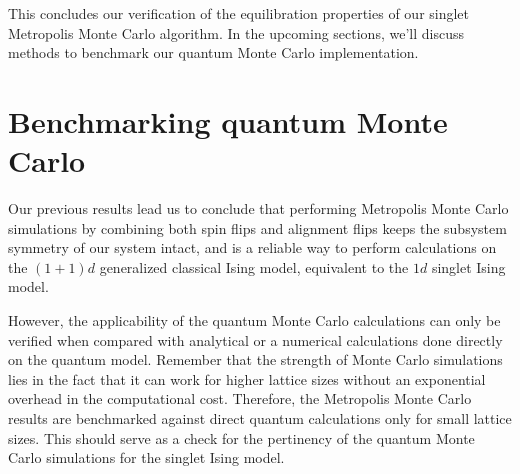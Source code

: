 \documentclass[../thesis_main.tex]{subfiles}
\begin{document}
This concludes our verification of the equilibration properties of our singlet Metropolis Monte Carlo algorithm. In the upcoming sections, we'll discuss methods to benchmark our quantum Monte Carlo implementation.
  
\section{Benchmarking quantum Monte Carlo}
Our previous results lead us to conclude that performing Metropolis Monte Carlo simulations by combining both spin flips and alignment flips keeps the subsystem symmetry of our system intact, and is a reliable way to perform calculations on the $(1+1)d$ generalized classical Ising model, equivalent to the $1d$ singlet Ising model.

However, the applicability of the quantum Monte Carlo calculations can only be verified when compared with analytical or a numerical calculations done directly on the quantum model. Remember that the strength of Monte Carlo simulations lies in the fact that it can work for higher lattice sizes without an exponential overhead in the computational cost. Therefore, the Metropolis Monte Carlo results are benchmarked against direct quantum calculations only for small lattice sizes. This should serve as a check for the pertinency of the quantum Monte Carlo simulations for the singlet Ising model.
\end{document}
